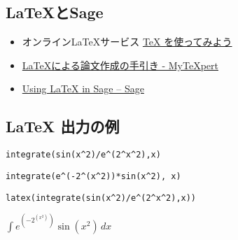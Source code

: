 \documentclass[dvipdfmx,11pt]{jarticle}
\begin{document}
\subsection{\LaTeX{}とSage}
\label{sec:org255371c}

\begin{itemize}
\item オンライン\LaTeX{}サービス  \href{https://oku.edu.mie-u.ac.jp/\~okumura/texonweb/}{\TeX{} を使ってみよう}

\item \href{https://mytexpert.osdn.jp/index.php?LaTeX\%A4\%CB\%A4\%E8\%A4\%EB\%CF\%C0\%CA\%B8\%BA\%EE\%C0\%AE\%A4\%CE\%BC\%EA\%B0\%FA\%A4\%AD}{\LaTeX{}による論文作成の手引き - MyTeXpert}

\item \href{http://sage.math.gordon.edu/home/pub/51/}{Using \LaTeX{} in Sage -- Sage}
\end{itemize}

\subsection{\LaTeX{} 出力の例}
\label{sec:org584e44c}


\begin{verbatim}
integrate(sin(x^2)/e^(2^x^2),x)
\end{verbatim}
\begin{center}


\begin{verbatim}
integrate(e^(-2^(x^2))*sin(x^2), x)
\end{verbatim}

\begin{verbatim}
latex(integrate(sin(x^2)/e^(2^x^2),x))

\end{verbatim}




\(\int e^{\left(-2^{\left(x^{2}\right)}\right)}\sin\left(x^{2}\right)\,{d x}\)
\end{center}
\end{document}
